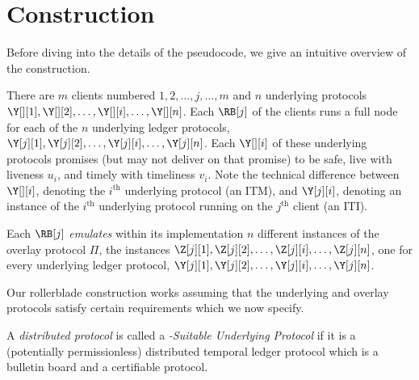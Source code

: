 \section{Construction}\label{sec:construction}

Before diving into the details of the pseudocode, we give an intuitive overview
of the \rollerblade construction.


There are $m$ \rollerblade clients numbered $1, 2,\allowbreak \ldots,\allowbreak j,\allowbreak \ldots,\allowbreak m$
and $n$ underlying protocols $\Y[][1], \Y[][2],\allowbreak \ldots,\allowbreak \Y[][i],\allowbreak \ldots,\allowbreak \Y[][n]$.
Each $\RB[j]$ of the clients runs a full node for each of the $n$ underlying
ledger protocols,
$\Y[j][1], \Y[j][2],\allowbreak\ldots,\allowbreak \Y[j][i],\allowbreak \ldots,\allowbreak \Y[j][n]$.
Each $\Y[][i]$ of these underlying protocols promises (but may not deliver on that promise)
to be safe, live with liveness $u_i$, and timely with timeliness $v_i$.
Note the technical difference between $\Y[][i]$, denoting the $i^\text{th}$ underlying protocol (an ITM),
and $\Y[j][i]$, denoting an instance of the $i^\text{th}$ underlying protocol running on the
$j^\text{th}$ client (an ITI).

Each $\RB[j]$ \emph{emulates} within its implementation $n$ different instances
of the overlay protocol $\Pi$, the instances
$\Z[j][1], \Z[j][2],\allowbreak \ldots,\allowbreak \Z[j][i],\allowbreak \ldots,\allowbreak \Z[j][n]$,
one for every underlying ledger protocol,
$\Y[j][1], \Y[j][2],\allowbreak \ldots,\allowbreak \Y[j][i],\allowbreak \ldots,\allowbreak \Y[j][n]$.

Our rollerblade construction works assuming that the underlying and overlay protocols satisfy
certain requirements which we now specify.

\begin{definition}
  A \emph{distributed protocol} is called a \emph{\rollerblade-Suitable
  Underlying Protocol} if it is a
  (potentially permissionless)
  distributed temporal ledger protocol
  which is a bulletin board and a
  certifiable protocol.
\end{definition}

